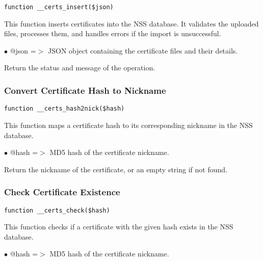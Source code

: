 \documentclass[a4paper]{article}
\begin{document}
\begin{lstlisting}
function __certs_insert($json)
\end{lstlisting}

This function inserts certificates into the NSS database. It validates the uploaded files,
processes them, and handles errors if the import is unsuccessful.

\begin{compactitem}
\item[\color{myblue}$\bullet$] @json =$>$ JSON object containing the certificate files and their details.
\end{compactitem}

Return the status and message of the operation.

\hypertarget{toc5}{}
\subsubsection{Convert Certificate Hash to Nickname}

\begin{lstlisting}
function __certs_hash2nick($hash)
\end{lstlisting}

This function maps a certificate hash to its corresponding nickname in the NSS database.

\begin{compactitem}
\item[\color{myblue}$\bullet$] @hash =$>$ MD5 hash of the certificate nickname.
\end{compactitem}

Return the nickname of the certificate, or an empty string if not found.

\hypertarget{toc6}{}
\subsubsection{Check Certificate Existence}

\begin{lstlisting}
function __certs_check($hash)
\end{lstlisting}

This function checks if a certificate with the given hash exists in the NSS database.

\begin{compactitem}
\item[\color{myblue}$\bullet$] @hash =$>$ MD5 hash of the certificate nickname.
\end{compactitem}
\end{document}
